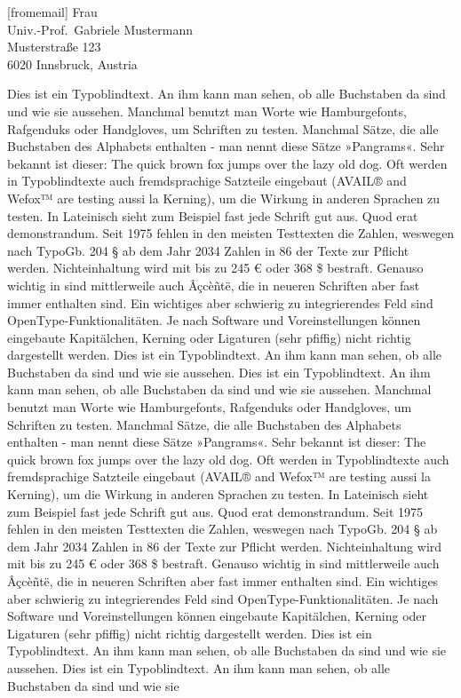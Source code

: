 \documentclass[german,noconfig,
]{uibklttr}
\begin{document}
\begin{letter}[fromemail]{%
  Frau\\
  Univ.-Prof.~Gabriele Mustermann\\
  Musterstraße 123\\
  6020 Innsbruck, Austria}
\clearpage

Dies ist ein Typoblindtext. An ihm kann man sehen, ob alle Buchstaben da sind
und wie sie aussehen. Manchmal benutzt man Worte wie Hamburgefonts, Rafgenduks
oder Handgloves, um Schriften zu testen. Manchmal Sätze, die alle Buchstaben des
Alphabets enthalten - man nennt diese Sätze »Pangrams«. Sehr bekannt ist dieser:
The quick brown fox jumps over the lazy old dog. Oft werden in Typoblindtexte
auch fremdsprachige Satzteile eingebaut (AVAIL® and Wefox™ are testing aussi la
Kerning), um die Wirkung in anderen Sprachen zu testen. In Lateinisch sieht zum
Beispiel fast jede Schrift gut aus. Quod erat demonstrandum. Seit 1975 fehlen in
den meisten Testtexten die Zahlen, weswegen nach TypoGb. 204 § ab dem Jahr 2034
Zahlen in 86 der Texte zur Pflicht werden. Nichteinhaltung wird mit bis zu 245 €
oder 368 \$ bestraft.  Genauso wichtig in sind mittlerweile auch Âçcèñtë, die in
neueren Schriften aber fast immer enthalten sind. Ein wichtiges aber schwierig
zu integrierendes Feld sind OpenType-Funktionalitäten. Je nach Software und
Voreinstellungen können eingebaute Kapitälchen, Kerning oder Ligaturen (sehr
pfiffig) nicht richtig dargestellt werden.  Dies ist ein Typoblindtext. An ihm
kann man sehen, ob alle Buchstaben da sind und wie sie aussehen.  Dies ist ein
Typoblindtext. An ihm kann man sehen, ob alle Buchstaben da sind und wie sie
aussehen. Manchmal benutzt man Worte wie Hamburgefonts, Rafgenduks oder
Handgloves, um Schriften zu testen. Manchmal Sätze, die alle Buchstaben des
Alphabets enthalten - man nennt diese Sätze »Pangrams«. Sehr bekannt ist dieser:
The quick brown fox jumps over the lazy old dog. Oft werden in Typoblindtexte
auch fremdsprachige Satzteile eingebaut (AVAIL® and Wefox™ are testing aussi la
Kerning), um die Wirkung in anderen Sprachen zu testen. In Lateinisch sieht zum
Beispiel fast jede Schrift gut aus. Quod erat demonstrandum. Seit 1975 fehlen in
den meisten Testtexten die Zahlen, weswegen nach TypoGb. 204 § ab dem Jahr 2034
Zahlen in 86 der Texte zur Pflicht werden. Nichteinhaltung wird mit bis zu 245 €
oder 368 \$ bestraft.  Genauso wichtig in sind mittlerweile auch Âçcèñtë, die in
neueren Schriften aber fast immer enthalten sind. Ein wichtiges aber schwierig
zu integrierendes Feld sind OpenType-Funktionalitäten. Je nach Software und
Voreinstellungen können eingebaute Kapitälchen, Kerning oder Ligaturen (sehr
pfiffig) nicht richtig dargestellt werden.  Dies ist ein Typoblindtext. An ihm
kann man sehen, ob alle Buchstaben da sind und wie sie aussehen. Dies ist ein
Typoblindtext. An ihm kann man sehen, ob alle Buchstaben da sind und wie sie

\end{letter}
\end{document}
